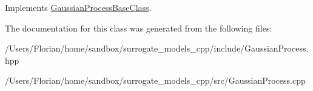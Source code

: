 Implements \hyperlink{class_gaussian_process_base_class_a889b7728135d6076a4854c165765e9d0}{Gaussian\+Process\+Base\+Class}.



The documentation for this class was generated from the following files\+:\begin{DoxyCompactItemize}
\item 
/\+Users/\+Florian/home/sandbox/surrogate\+\_\+models\+\_\+cpp/include/Gaussian\+Process.\+hpp\item 
/\+Users/\+Florian/home/sandbox/surrogate\+\_\+models\+\_\+cpp/src/Gaussian\+Process.\+cpp\end{DoxyCompactItemize}
